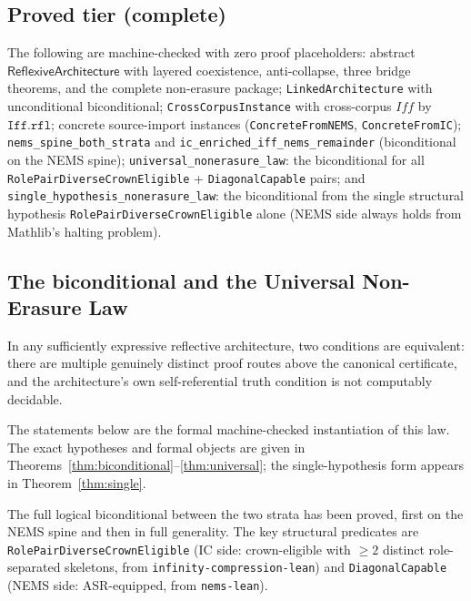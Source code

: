 \documentclass[11pt]{article}
\newcommand{\RAL}{\ensuremath{\mathsf{ReflexiveArchitecture}}}
\begin{document}
\subsection{Proved tier (complete)}

The following are machine-checked with zero proof placeholders:
abstract $\RAL$ with layered coexistence, anti-collapse, three bridge theorems,
and the complete non-erasure package;
\texttt{LinkedArchitecture} with unconditional biconditional;
\texttt{CrossCorpusInstance} with cross-corpus $\mathit{Iff}$ by $\mathtt{Iff.rfl}$;
concrete source-import instances (\texttt{ConcreteFromNEMS}, \texttt{ConcreteFromIC});
\texttt{nems\_spine\_both\_strata} and \texttt{ic\_enriched\_iff\_nems\_remainder}
(biconditional on the NEMS spine);
\texttt{universal\_nonerasure\_law}: the biconditional for all
\texttt{RolePairDiverseCrownEligible} + \texttt{DiagonalCapable} pairs;
and \texttt{single\_hypothesis\_nonerasure\_law}: the biconditional from the
single structural hypothesis \texttt{RolePairDiverseCrownEligible} alone
(NEMS side always holds from Mathlib's halting problem).

\subsection{The biconditional and the Universal Non-Erasure Law}
\label{sec:frontier}

\begin{principle}
In any sufficiently expressive reflective architecture, two conditions are equivalent:
there are multiple genuinely distinct proof routes above the canonical certificate, and
the architecture's own self-referential truth condition is not computably decidable.
\end{principle}

The statements below are the formal machine-checked instantiation of this law.
The exact hypotheses and formal objects are given in
Theorems~\ref{thm:biconditional}--\ref{thm:universal}; the single-hypothesis form
appears in Theorem~\ref{thm:single}.

The full logical biconditional between the two strata has been proved, first on the
NEMS spine and then in full generality.  The key structural predicates are
\texttt{RolePairDiverseCrownEligible} (IC side: crown-eligible with $\geq 2$ distinct
role-separated skeletons, from \texttt{infinity-compression-lean}) and
\texttt{DiagonalCapable} (NEMS side: ASR-equipped, from \texttt{nems-lean}).
\end{document}

